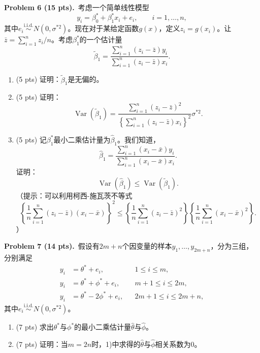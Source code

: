 \documentclass[UTF8,a4paper,11pt,fontset=fandol]{ctexart}
\newcommand{\problem}[2]{\par\addvspace{10pt}\Needspace{5\baselineskip}\textbf{Problem #1 (#2 pts).}\ }
\DeclareMathOperator{\Var}{Var}
\begin{document}
\newpage
\problem{6}{15}考虑一个简单线性模型
\begin{equation*}
  y_i=\beta_0^*+\beta_1^*x_i+e_i,\qquad i=1,\ldots,n,
\end{equation*}
其中$e_i\overset{\mathrm{i.i.d.}}{\sim}N(0,\sigma^{*2})$。现在对于某给定函数$g(x)$，定义$z_i=g(x_i)$。让$\bar z=\sum_{i=1}^n z_i/n$。考虑$\beta_1^*$的一个估计量
\begin{equation*}
  \widetilde\beta_1=\frac{\sum_{i=1}^n(z_i-\bar z)y_i}{\sum_{i=1}^n(z_i-\bar z)x_i}.
\end{equation*}
\begin{enumerate}
  \item (5 pts) 证明：$\widetilde\beta_1$是无偏的。
  \item (5 pts) 证明：
  \begin{equation*}
    \Var(\widetilde\beta_1)=
    \frac{\sum_{i=1}^n(z_i-\bar z)^2}
         {\left\{\sum_{i=1}^n(z_i-\bar z)x_i\right\}^2}\sigma^{*2}.
  \end{equation*}
  \item (5 pts) 记$\beta_1^*$最小二乘估计量为$\widehat\beta_1$。我们知道，
  \begin{equation*}
    \widehat\beta_1=\frac{\sum_{i=1}^n(x_i-\bar x)y_i}{\sum_{i=1}^n(x_i-\bar x)x_i}.
  \end{equation*}
  证明：
  \begin{equation*}
    \Var(\widehat\beta_1)\le\Var(\widetilde\beta_1).
  \end{equation*}
  （提示：可以利用柯西-施瓦茨不等式
  \begin{equation*}
    \left\{\frac1n\sum_{i=1}^n(z_i-\bar z)(x_i-\bar x)\right\}^2
    \le
    \left\{\frac1n\sum_{i=1}^n(z_i-\bar z)^2\right\}
    \left\{\frac1n\sum_{i=1}^n(x_i-\bar x)^2\right\}.
  \end{equation*}
  ）
\end{enumerate}

\problem{7}{14}假设有$2m+n$个因变量的样本$y_1,\ldots,y_{2m+n}$，分为三组，分别满足
\begin{equation*}
  \begin{aligned}
    y_i&=\theta^*+e_i,       &&1\le i\le m,\\
    y_i&=\theta^*+\phi^*+e_i, &&m+1\le i\le2m,\\
    y_i&=\theta^*-2\phi^*+e_i,&&2m+1\le i\le2m+n,
  \end{aligned}
\end{equation*}
其中$e_i\overset{\mathrm{i.i.d.}}{\sim}N(0,\sigma^{*2})$。
\begin{enumerate}
  \item (7 pts) 求出$\theta^*$与$\phi^*$的最小二乘估计量$\widehat\theta$与$\widehat\phi$。
  \item (7 pts) 证明：当$m=2n$时，1)中求得的$\widehat\theta$与$\widehat\phi$相关系数为0。
\end{enumerate}
\end{document}
